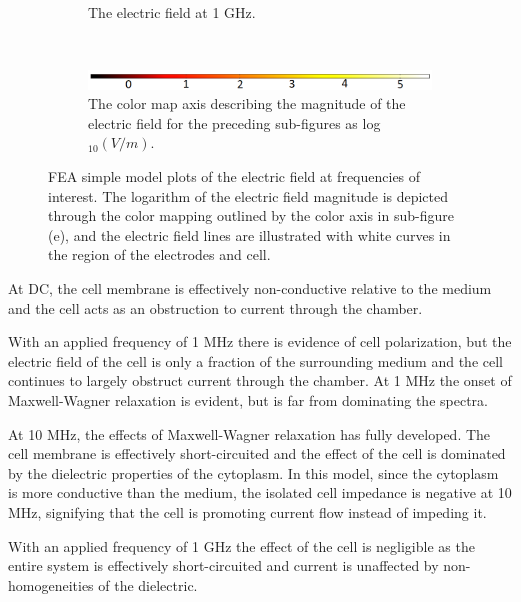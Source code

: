 \begin{figure}[h]
\begin{subfigure}[b]{\textwidth}
        \caption{The electric field at 1 GHz.}
    \end{subfigure}
        \\
    \vspace{0.1 in}
    \begin{subfigure}[b]{\textwidth}
        \centering
        \includegraphics[width=\textwidth]{images/simpleCellColorMapAxis.png}
        \caption{The color map axis describing the magnitude of the electric field for the preceding sub-figures as log$_{10}(V/m)$.}
    \end{subfigure}
    \caption[FEA simple model electric field surface plot.]{FEA simple model plots of the electric field at frequencies of interest. The logarithm of the electric field magnitude is depicted through the color mapping outlined by the color axis in sub-figure (e), and the electric field lines are illustrated with white curves in the region of the electrodes and cell.}
    \label{fig:single_cell_model_EZ_plots}
\end{figure}

\par At DC, the cell membrane is effectively non-conductive relative to the medium and the cell acts as an obstruction to current through the chamber. 
\par With an applied frequency of 1 MHz there is evidence of cell polarization, but the electric field of the cell is only a fraction of the surrounding medium and the cell continues to largely obstruct current through the chamber. At 1 MHz the onset of Maxwell-Wagner relaxation is evident, but is far from dominating the spectra. 

\par At 10 MHz, the effects of Maxwell-Wagner relaxation has fully developed. The cell membrane is effectively short-circuited and the effect of the cell is dominated by the dielectric properties of the cytoplasm. In this model, since the cytoplasm is more conductive than the medium, the isolated cell impedance is negative at 10 MHz, signifying that the cell is promoting current flow instead of impeding it. 

\par With an applied frequency of 1 GHz the effect of the cell is negligible as the entire system is effectively short-circuited and current is unaffected by non-homogeneities of the dielectric. 



